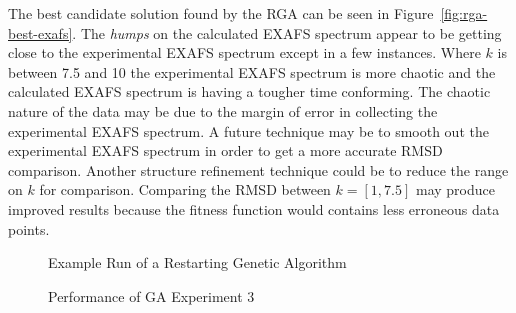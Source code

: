 The best candidate solution found by the RGA can be seen in Figure~\ref{fig:rga-best-exafs}. The \textit{humps} on the calculated EXAFS spectrum appear to be getting close to the experimental EXAFS spectrum except in a few instances. Where $k$ is between 7.5 and 10 the experimental EXAFS spectrum is more chaotic and the calculated EXAFS spectrum is having a tougher time conforming. The chaotic nature of the data may be due to the margin of error in collecting the experimental EXAFS spectrum. A future technique may be to smooth out the experimental EXAFS spectrum in order to get a more accurate RMSD comparison. Another structure refinement technique could be to reduce the range on $k$ for comparison. Comparing the RMSD between $k = [1,7.5]$ may produce improved results because the fitness function would contains less erroneous data points.

\begin{figure}
	\centering
	\caption{Example Run of a Restarting Genetic Algorithm}
	\label{fig:rga-generational-data}
\end{figure}

\begin{figure}
	\centering
	\caption{Performance of GA Experiment 3}
	\label{fig:ga-generational-data-avg}
\end{figure}

